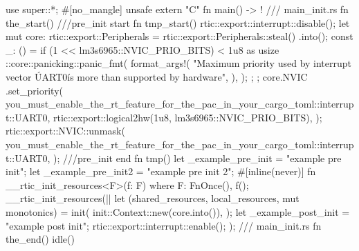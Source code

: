 {{        use super::*;
        #[no_mangle]
        unsafe extern "C" fn main() -> ! {
            /// main_init.rs
            fn the_start() {}
            ///pre_init start
            fn tmp_start() {}
            rtic::export::interrupt::disable();
            let mut core: rtic::export::Peripherals = rtic::export::Peripherals::steal()
                .into();
            const _: () = if (1 << lm3s6965::NVIC_PRIO_BITS) < 1u8 as usize {
                {
                    ::core::panicking::panic_fmt(
                        format_args!(
                            "Maximum priority used by interrupt vector \'UART0\' is more than supported by hardware",
                        ),
                    );
                };
            };
            core.NVIC
                .set_priority(
                    you_must_enable_the_rt_feature_for_the_pac_in_your_cargo_toml::interrupt::UART0,
                    rtic::export::logical2hw(1u8, lm3s6965::NVIC_PRIO_BITS),
                );
            rtic::export::NVIC::unmask(
                you_must_enable_the_rt_feature_for_the_pac_in_your_cargo_toml::interrupt::UART0,
            );
            ///pre_init end
            fn tmp() {}
            let _example_pre_init = "example pre init";
            let _example_pre_init2 = "example pre init 2";
            #[inline(never)]
            fn __rtic_init_resources<F>(f: F)
            where
                F: FnOnce(),
            {
                f();
            }
            __rtic_init_resources(|| {
                let (shared_resources, local_resources, mut monotonics) = init(
                    init::Context::new(core.into()),
                );
                let _example_post_init = "example post init";
                rtic::export::interrupt::enable();
            });
            /// main_init.rs
            fn the_end() {}
            idle()
        }
    }
}
